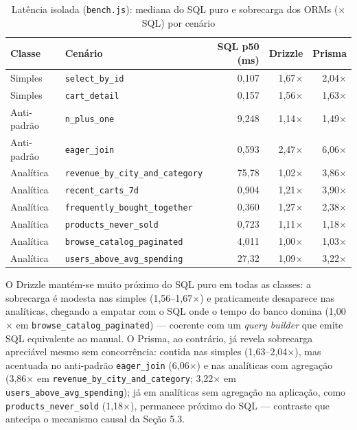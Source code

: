 \documentclass[12pt]{article}
\begin{document}
\begin{table}[!htb]
\centering
\caption{Latência isolada (\texttt{bench.js}): mediana do SQL puro e sobrecarga dos ORMs ($\times$SQL) por cenário}
\label{tab:bench}
\scriptsize
\begin{tabular}{@{}llrrr@{}}
\toprule
Classe & Cenário & SQL p50 (ms) & Drizzle & Prisma \\
\midrule
Simples & \texttt{select\_by\_id} & 0,107 & 1,67$\times$ & 2,04$\times$ \\
Simples & \texttt{cart\_detail} & 0,157 & 1,56$\times$ & 1,63$\times$ \\
Anti-padrão & \texttt{n\_plus\_one} & 9,248 & 1,14$\times$ & 1,49$\times$ \\
Anti-padrão & \texttt{eager\_join} & 0,593 & 2,47$\times$ & 6,06$\times$ \\
Analítica & \texttt{revenue\_by\_city\_and\_category} & 75,78 & 1,02$\times$ & 3,86$\times$ \\
Analítica & \texttt{recent\_carts\_7d} & 0,904 & 1,21$\times$ & 3,90$\times$ \\
Analítica & \texttt{frequently\_bought\_together} & 0,360 & 1,27$\times$ & 2,38$\times$ \\
Analítica & \texttt{products\_never\_sold} & 0,723 & 1,11$\times$ & 1,18$\times$ \\
Analítica & \texttt{browse\_catalog\_paginated} & 4,011 & 1,00$\times$ & 1,03$\times$ \\
Analítica & \texttt{users\_above\_avg\_spending} & 27,32 & 1,09$\times$ & 3,22$\times$ \\
\bottomrule
\end{tabular}

\vspace{2pt}{\footnotesize Fonte: elaboração própria.}
\end{table}

O Drizzle mantém-se muito próximo do SQL puro em todas as classes: a
sobrecarga é modesta nas simples (1,56--1,67$\times$) e praticamente
desaparece nas analíticas, chegando a empatar com o SQL onde o tempo do
banco domina (1,00$\times$ em \texttt{browse\_catalog\_paginated})
--- coerente com um \textit{query builder} que emite SQL equivalente ao
manual. O Prisma, ao contrário, já revela sobrecarga apreciável mesmo sem
concorrência: contida nas simples (1,63--2,04$\times$), mas acentuada no
anti-padrão \texttt{eager\_join} (6,06$\times$) e nas analíticas com
agregação (3,86$\times$ em \texttt{revenue\_by\_city\_and\_category};
3,22$\times$ em \texttt{users\_above\_avg\_spending}); já em analíticas
sem agregação na aplicação, como \texttt{products\_never\_sold}
(1,18$\times$), permanece próximo do SQL --- contraste que antecipa o
mecanismo causal da Seção 5.3.
\end{document}
